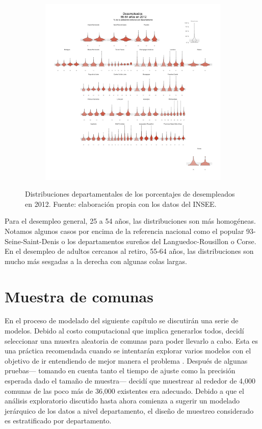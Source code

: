 \begin{figure}[H]
\begin{subfigure}{0.3\textwidth}
	\end{subfigure}~
	\begin{subfigure}{0.3\textwidth}
	\includegraphics[width = \textwidth]{Figs/AED/Geofacet_Distr_por_Dpto_Des3_2012}
	\end{subfigure}
	\caption{Distribuciones departamentales de los porcentajes de desempleados en 2012. Fuente: elaboración propia con los datos del INSEE.}
	\label{fig:Distr_por_Dpto_Ocu_2012}	
\end{figure}

Para el desempleo general, 25 a 54 años, las distribuciones son más homogéneas. Notamos algunos casos por encima de la referencia nacional como el popular 93-Seine-Saint-Denis o los departamentos sureños del Languedoc-Rousillon o Corse. En el desempleo de adultos cercanos al retiro, 55-64 años, las distribuciones son mucho más sesgadas a la derecha con algunas colas largas. 

\section{Muestra de comunas}\label{secc:muestra}

En el proceso de modelado del siguiente capítulo se discutirán una serie de modelos. Debido al costo computacional que implica generarlos todos, decidí seleccionar una muestra aleatoria de comunas para poder llevarlo a cabo. Esta es una práctica recomendada cuando se intentarán explorar varios modelos con el objetivo de ir entendiendo de mejor manera el problema \parencite{GelmanHill06}. Después de algunas pruebas--- tomando en cuenta tanto el tiempo de ajuste como la precisión esperada dado el tamaño de muestra--- decidí que muestrear al rededor de 4,000 comunas de las poco más de 36,000 existentes era adecuado. Debido a que el análisis exploratorio discutido hasta ahora comienza a sugerir un modelado jerárquico de los datos a nivel departamento, el diseño de muestreo considerado es estratificado por departamento.\\ 

